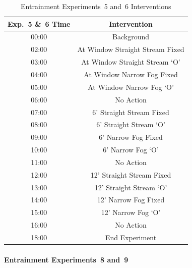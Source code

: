 \documentclass[12pt,oneside]{book}
\begin{document}
\begin{table}[H]
	\centering
	\caption{Entrainment Experiments~5 and~6 Interventions}
	\begin{tabular}{|c|c|} 
		\hline
		Exp.~5 \&~6 Time 	& 	Intervention 	\\ \hline \hline
			00:00			& 	Background 	\\ \hline
			02:00			&	At Window Straight Stream Fixed 	\\ \hline
			03:00			&	At Window Straight Stream `O' 	\\ \hline
			04:00			&	At Window Narrow Fog Fixed 	\\ \hline
			05:00			&	At Window Narrow Fog `O' 	\\ \hline
			06:00			&	No Action 	\\ \hline
			07:00			&	6' Straight Stream Fixed 	\\ \hline
			08:00			&	6' Straight Stream `O' 	\\ \hline
			09:00			&	6' Narrow Fog Fixed 	\\ \hline
			10:00			&	6' Narrow Fog `O' 	\\ \hline
			11:00			&	No Action 	\\ \hline
			12:00			&	12' Straight Stream Fixed 	\\ \hline
			13:00			&	12' Straight Stream `O' 	\\ \hline
			14:00			&	12' Narrow Fog Fixed 	\\ \hline
			15:00			&	12' Narrow Fog `O' 	\\ \hline
			16:00			&	No Action 	\\ \hline
			18:00			&	End Experiment 	\\ \hline
	\end{tabular}
	\label{Table:EntExp5_and_6_Interventions}
\end{table}

\FloatBarrier

\paragraph{Entrainment Experiments~8 and~9} \mbox{}

\end{document}
